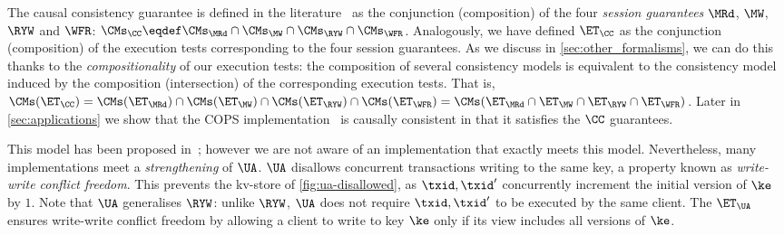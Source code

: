 %
%
%
%
%
The causal consistency guarantee is defined in the literature~\cite{session2causal} as the conjunction (composition) of the four \emph{session guarantees} \(\MRd\), \(\MW\), \(\RYW\) and \(\WFR\):   
$\CMs_{\CC} \eqdef \CMs_{\MRd} \cap \CMs_{\MW} \cap \CMs_{\RYW} \cap \CMs_{\WFR}$. 
Analogously, we have defined $\ET_\CC$ as the conjunction (composition) of the execution tests corresponding to the four session guarantees.
As we discuss in \cref{sec:other_formalisms}, we can do this thanks to the \emph{compositionality} of our execution tests:
the composition of several consistency models is equivalent to the consistency model induced by the composition (intersection) of the corresponding execution tests. 
That is, $\CMs(\ET_\CC) = \CMs(\ET_{\MRd}) \cap \CMs(\ET_{\MW}) \cap \CMs(\ET_{\RYW}) \cap \CMs(\ET_{\WFR}) = \CMs(\ET_{\MRd} \cap \ET_{\MW} \cap \ET_{\RYW} \cap \ET_{\WFR})$.
Later in \cref{sec:applications} we show that the COPS implementation~\cite{cops} is causally consistent in that it satisfies the $\CC$ guarantees. 

  

This model has been proposed in~\cite{framework-concur};
however we are not aware of an implementation that exactly meets  this model.
Nevertheless, many implementations meet a
\emph{strengthening} of $\UA$.
$\UA$ disallows concurrent transactions writing to the same key,
a property known as \emph{write-write conflict freedom}.
This prevents the kv-store of \cref{fig:ua-disallowed},
as $\txid, \txid'$ concurrently increment the initial version of $\ke$ by $1$.
Note that $\UA$ generalises $\RYW$: unlike $\RYW$, $\UA$ does not require $\txid, \txid'$ to be executed by the same client.
The $\ET_\UA$ ensures write-write conflict freedom by allowing a client to write to key $\ke$
only if its view includes all versions of $\ke$.

